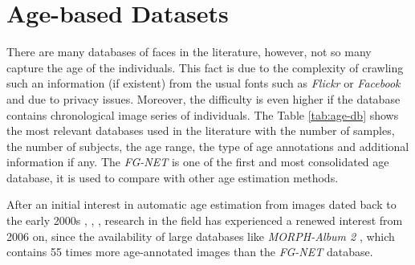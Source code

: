 \section{Age-based Datasets} \label{sec:ageDB}
There are many databases of faces in the literature, however, not so many capture the age of the individuals. This fact is due to the complexity of crawling such an information (if existent) from the usual fonts such as \textit{Flickr} or \textit{Facebook} and due to privacy issues. Moreover, the difficulty is even higher if the database contains chronological image series of individuals. The Table \ref{tab:age-db} shows the most relevant databases used in the literature with the number of samples, the number of subjects, the age range, the type of age annotations and additional information if any. The \textit{FG-NET} \cite{993553} is one of the first and most consolidated age database, it is used to compare with other age estimation methods.

After an initial interest in automatic age estimation from images dated back to the early 2000s \cite{Lanitis:2004:CDC:2225304.2226166}, \cite{993553}, \cite{palDB}, research in the field has experienced a renewed interest from 2006 on, since the availability of large databases like \textit{MORPH-Album 2} \cite{1613043}, which contains 55 times more age-annotated images than the \textit{FG-NET} database.

